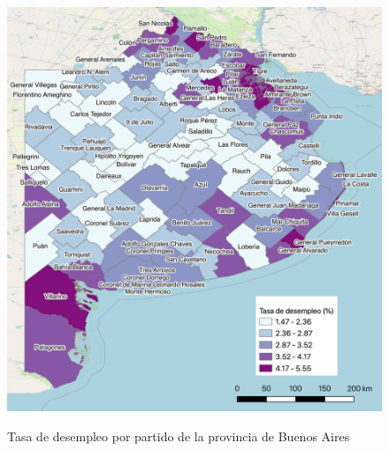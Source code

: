 \documentclass[9pt]{article}
\begin{document}
\begin{figure}[H]
    \centering
    \caption{Tasa de desempleo por partido de la provincia de Buenos Aires}
    \includegraphics[width=\textwidth]{BSAS_Desempleo.png}
    \label{fig:Desempleo}
\end{figure}
\end{document}
